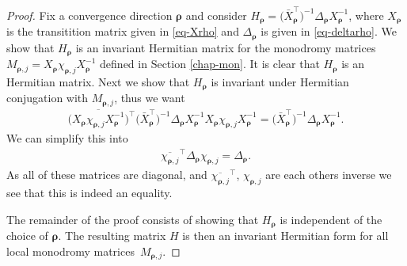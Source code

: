 \documentclass[pdftex]{sigma}
\numberwithin{equation}{section}
\begin{document}
\begin{proof}
Fix a convergence direction $\bm\rho$ and consider $H_{\bm\rho} = \big(\bar{X}_{\bm\rho}^{\intercal}\big)^{-1} \Delta_{\bm\rho} X_{\bm\rho}^{-1}$, where $X_{\bm{\rho}}$ is the transitition matrix given in \eqref{eq-Xrho} and $\Delta_{\bm\rho}$ is given in \eqref{eq-deltarho}. We show that $H_{\bm\rho}$ is an invariant Hermitian matrix for the monodromy matrices $M_{\bm\rho,j} = X_{\bm\rho} \chi_{\bm\rho,j} X_{\bm\rho}^{-1}$ defined in Section \ref{chap-mon}. It is clear that $H_{\bm\rho}$ is an Hermitian matrix. Next we show that $H_{\bm\rho}$ is invariant under Hermitian conjugation with $M_{\bm\rho,j}$, thus we want
\begin{gather*}
\big(\overline{X_{\bm\rho} \chi_{\bm\rho,j} X_{\bm\rho}^{-1}}\big)^{\intercal}\big(\bar{X}_{\bm\rho}^{\intercal}\big)^{-1} \Delta_{\bm\rho} X_{\bm\rho}^{-1} X_{\bm\rho} \chi_{\bm\rho,j} X_{\bm\rho}^{-1} = \big(\bar{X}_{\bm\rho}^{\intercal}\big)^{-1} \Delta_{\bm\rho} X_{\bm\rho}^{-1}.
\end{gather*}
We can simplify this into
\begin{gather*}
\overline{\chi_{\bm\rho,j}}^{\intercal}\Delta_{\bm\rho} \chi_{\bm\rho,j} = \Delta_{\bm\rho}.
\end{gather*}
As all of these matrices are diagonal, and $\overline{\chi_{\bm\rho,j}}^{\intercal}$,
$\chi_{\bm\rho,j}$ are each others inverse we see that this is indeed an equality.

The remainder of the proof consists of showing that $H_{\bm\rho}$ is independent of the
choice of $\bm\rho$. The resulting matrix $H$ is then an invariant Hermitian form for all
local monodromy matrices~$M_{\bm\rho,j}$.


\end{proof}
\end{document}
